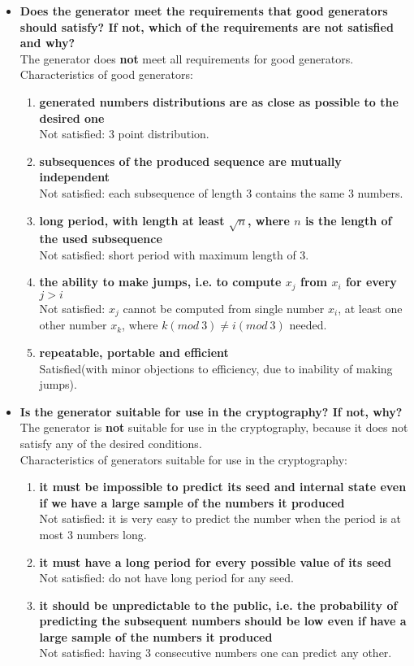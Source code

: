 \documentclass[a4paper,10pt]{article}
\begin{document}
\begin{itemize}
 \item \textbf{Does the generator meet the requirements that good generators should satisfy? If not, which of the requirements are not satisfied and why?} \\
  The generator does \textbf{not} meet all requirements for good generators. \\
  Characteristics of good generators:
   \begin{enumerate}
    \item \textbf{generated numbers distributions are as close as possible to the desired one} \\
    Not satisfied: 3 point distribution.
    \item \textbf{subsequences of the produced sequence are mutually independent} \\
    Not satisfied: each subsequence of length 3 contains the same 3 numbers.
    \item \textbf{long period, with length at least $\sqrt{n}$, where $n$ is the length of the used subsequence} \\
    Not satisfied: short period with maximum length of 3.
    \item \textbf{the ability to make jumps, i.e. to compute $x_j$ from $x_i$ for every $j > i$} \\
    Not satisfied: $x_j$ cannot be computed from single number $x_i$, at least one other number $x_k$, where $k(mod\ 3) \neq i(mod\ 3)$  needed.
    \item \textbf{repeatable, portable and efficient} \\
    Satisfied(with minor objections to efficiency, due to inability of making jumps).
   \end{enumerate}
 
 \item \textbf{Is the generator suitable for use in the cryptography? If not, why?} \\
  The generator is \textbf{not} suitable for use in the cryptography, because it does not satisfy any of the desired conditions.\\
 Characteristics of generators suitable for use in the cryptography:
  \begin{enumerate}
   \item \textbf{it must be impossible to predict its seed and internal state even if we have a large sample of the numbers it produced} \\
   Not satisfied: it is very easy to predict the number when the period is at most 3 numbers long.
   \item \textbf{it must have a long period for every possible value of its seed} \\
   Not satisfied: do not have long period for any seed.
   \item \textbf{it should be unpredictable to the public, i.e. the probability of predicting the subsequent numbers should be low even if have a large sample of the numbers it produced} \\
   Not satisfied: having 3 consecutive numbers one can predict any other.
   \end{enumerate}

\end{itemize}
\end{document}
